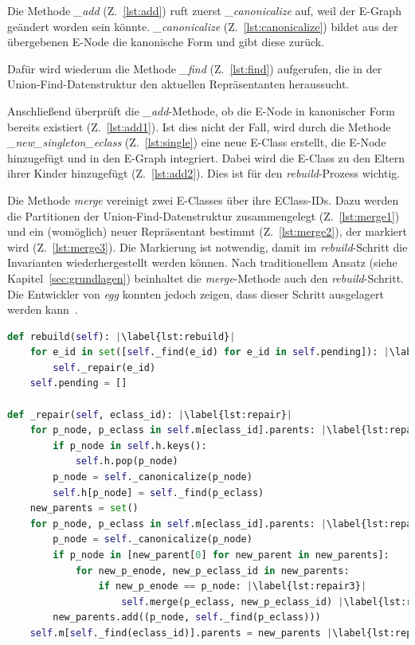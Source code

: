 Die Methode \textit{\_add} (Z.~\ref{lst:add}) ruft zuerst \textit{\_canonicalize} auf, weil der E-Graph geändert worden sein könnte.
\textit{\_canonicalize} (Z.~\ref{lst:canonicalize}) bildet aus der übergebenen E-Node die kanonische Form und gibt diese zurück.

Dafür wird wiederum die Methode \textit{\_find} (Z.~\ref{lst:find}) aufgerufen, die in der Union-Find-Datenstruktur den aktuellen Repräsentanten heraussucht.

Anschließend überprüft die \textit{\_add}-Methode, ob die E-Node in kanonischer Form bereits existiert (Z.~\ref{lst:add1}). Ist dies nicht der Fall, wird durch 
die Methode \textit{\_new\_singleton\_eclass} (Z.~\ref{lst:single}) eine neue E-Class erstellt, die E-Node hinzugefügt und in den E-Graph integriert. Dabei wird die E-Class zu den Eltern
ihrer Kinder hinzugefügt (Z.~\ref{lst:add2}). Dies ist für den \textit{rebuild}-Prozess wichtig.

Die Methode \textit{merge} vereinigt zwei E-Classes über ihre EClass-IDs. Dazu werden die Partitionen der Union-Find-Datenstruktur zusammengelegt (Z.~\ref{lst:merge1}) und ein (womöglich)
neuer Repräsentant bestimmt (Z.~\ref{lst:merge2}), der markiert wird (Z.~\ref{lst:merge3}). Die Markierung ist notwendig, damit im \textit{rebuild}-Schritt die Invarianten wiederhergestellt werden können.
Nach traditionellem Ansatz (siehe Kapitel~\ref{sec:grundlagen}) beinhaltet die \textit{merge}-Methode auch den \textit{rebuild}-Schritt. Die Entwickler von \textit{egg} konnten jedoch
zeigen, dass dieser Schritt ausgelagert werden kann~\cite{2021-egg}.

\begin{lstlisting}[language=Python, escapechar=|, caption=\textit{rebuild}- und \textit{repair}-Methode, label={lst:methods2}]
def rebuild(self): |\label{lst:rebuild}|
    for e_id in set([self._find(e_id) for e_id in self.pending]): |\label{lst:rebuild1}|
        self._repair(e_id)
    self.pending = []

def _repair(self, eclass_id): |\label{lst:repair}|
    for p_node, p_eclass in self.m[eclass_id].parents: |\label{lst:repair1}|
        if p_node in self.h.keys():
            self.h.pop(p_node)
        p_node = self._canonicalize(p_node)
        self.h[p_node] = self._find(p_eclass)
    new_parents = set()
    for p_node, p_eclass in self.m[eclass_id].parents: |\label{lst:repair2}|
        p_node = self._canonicalize(p_node)
        if p_node in [new_parent[0] for new_parent in new_parents]:
            for new_p_enode, new_p_eclass_id in new_parents:
                if new_p_enode == p_node: |\label{lst:repair3}|
                    self.merge(p_eclass, new_p_eclass_id) |\label{lst:repair4}|
        new_parents.add((p_node, self._find(p_eclass)))
    self.m[self._find(eclass_id)].parents = new_parents |\label{lst:repair99}|
\end{lstlisting} 

